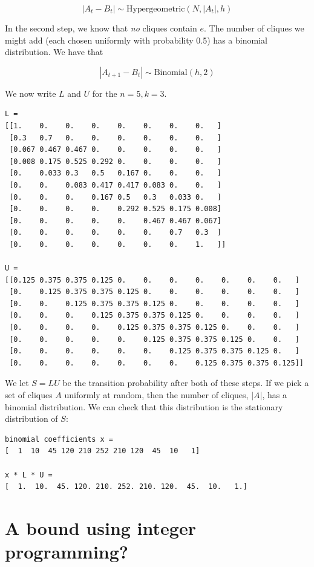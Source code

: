 \documentclass[12pt]{article}
\theoremstyle{definition}
\begin{document}
\[
|A_t - B_t| \sim \text{Hypergeometric}(N, |A_t|, h)
\]

In the second step, we know that {\em no} cliques contain $e$. The number of
cliques we might add (each chosen uniformly with probability 0.5) has 
a binomial distribution. We have that

\[
|A_{t+1} - B_t| \sim \text{Binomial}(h, 2)
\]

We now write $L$ and $U$ for the $n=5, k=3$.

\begin{verbatim}
L =
[[1.    0.    0.    0.    0.    0.    0.    0.   ]
 [0.3   0.7   0.    0.    0.    0.    0.    0.   ]
 [0.067 0.467 0.467 0.    0.    0.    0.    0.   ]
 [0.008 0.175 0.525 0.292 0.    0.    0.    0.   ]
 [0.    0.033 0.3   0.5   0.167 0.    0.    0.   ]
 [0.    0.    0.083 0.417 0.417 0.083 0.    0.   ]
 [0.    0.    0.    0.167 0.5   0.3   0.033 0.   ]
 [0.    0.    0.    0.    0.292 0.525 0.175 0.008]
 [0.    0.    0.    0.    0.    0.467 0.467 0.067]
 [0.    0.    0.    0.    0.    0.    0.7   0.3  ]
 [0.    0.    0.    0.    0.    0.    0.    1.   ]]

U =
[[0.125 0.375 0.375 0.125 0.    0.    0.    0.    0.    0.    0.   ]
 [0.    0.125 0.375 0.375 0.125 0.    0.    0.    0.    0.    0.   ]
 [0.    0.    0.125 0.375 0.375 0.125 0.    0.    0.    0.    0.   ]
 [0.    0.    0.    0.125 0.375 0.375 0.125 0.    0.    0.    0.   ]
 [0.    0.    0.    0.    0.125 0.375 0.375 0.125 0.    0.    0.   ]
 [0.    0.    0.    0.    0.    0.125 0.375 0.375 0.125 0.    0.   ]
 [0.    0.    0.    0.    0.    0.    0.125 0.375 0.375 0.125 0.   ]
 [0.    0.    0.    0.    0.    0.    0.    0.125 0.375 0.375 0.125]]
\end{verbatim}

We let $S = LU$ be the transition probability after both of these steps.
If we pick a set of cliques $A$ uniformly at random,
then the number of cliques, $|A|$, has a binomial distribution.
We can check that this distribution
is the stationary distribution of $S$:

\begin{verbatim}
binomial coefficients x =
[  1  10  45 120 210 252 210 120  45  10   1]

x * L * U =
[  1.  10.  45. 120. 210. 252. 210. 120.  45.  10.   1.]
\end{verbatim}

\section{A bound using integer programming?}
\end{document}
